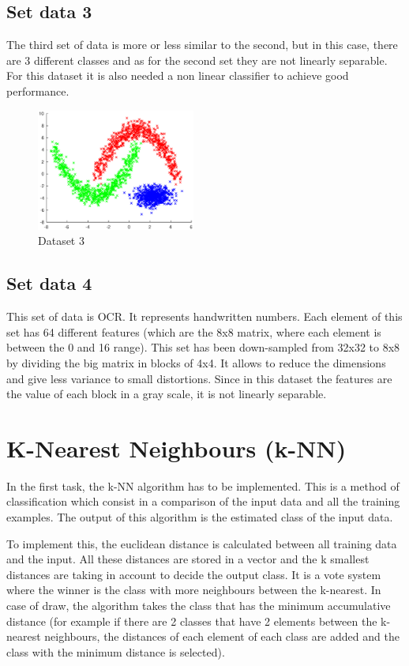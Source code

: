 \documentclass{article}
\begin{document}
\subsection{Set data 3}
The third set of data is more or less similar to the second, but in this case, there are 3 different classes and as for the second set they are not linearly separable. For this dataset it is also needed a non linear classifier to achieve good performance.
\begin{figure}[!htb]
\centering
\includegraphics[height=4cm]{images/dataset3}
\caption{Dataset 3}
\label{fig:dataset3}
\end{figure}
\subsection{Set data 4}
This set of data is OCR. It represents handwritten numbers. Each element of this set has 64 different features (which are the 8x8 matrix, where each element is between the 0 and 16 range). This set has been down-sampled from 32x32 to 8x8 by dividing the big matrix in blocks of 4x4. It allows to reduce the dimensions and give less variance to small distortions. Since in this dataset the features are the value of each block in a gray scale, it is not linearly separable. 

\section{K-Nearest Neighbours (k-NN)}
In the first task, the k-NN algorithm has to be implemented. This is a method of classification which consist in a comparison of the input data and all the training examples. The output of this algorithm is the estimated class of the input data.

To implement this, the euclidean distance is calculated between all training data and the input. All these distances are stored in a vector and the k smallest distances are taking in account to decide the output class. It is a vote system where the winner is the class with more neighbours between the k-nearest. In case of draw, the algorithm takes the class that has the minimum accumulative distance (for example if there are 2 classes that have 2 elements between the k-nearest neighbours, the distances of each element of each class are added and the class with the minimum distance is selected).
\end{document}
